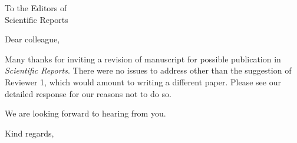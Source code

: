 \documentclass[USenglish, 10pt, UBonn_letterhead]{scrlttr2}
\begin{document}


\begin{letter}{%
        To the Editors of\\
        Scientific Reports \\
    }

    \opening{Dear colleague,}

    Many thanks for inviting a revision of manuscript for possible publication in
    \textit{Scientific Reports}. There were no issues to address other than the
    suggestion of Reviewer 1, which would amount to writing a different paper.
    Please see our detailed response for our reasons not to do so.

    We are looking forward to hearing from you.

    \closing{Kind regards,}

\end{letter}
\end{document}
